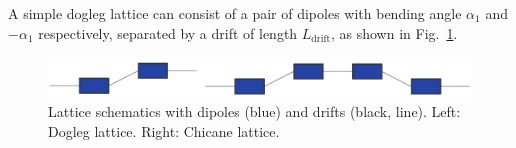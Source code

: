 \documentclass[../main.tex]{subfiles}
\begin{document}
A simple dogleg lattice can consist of a pair of dipoles with bending angle $\alpha_{1}$ and $-\alpha_{1}$ respectively, separated by a drift of length $L_{\mathrm{drift}}$, as shown in Fig.~\ref{fig:chicane_dogleg_schematic}.

\begin{figure}[!h]
\centering
\includegraphics[width=\textwidth]{Figures/Energy_Recovery_Linac_Design/chicane_dogleg.pdf}
\caption{Lattice schematics with dipoles (blue) and drifts (black, line). Left: Dogleg lattice. Right: Chicane lattice. }
\label{fig:chicane_dogleg_schematic}
\end{figure}
\end{document}
